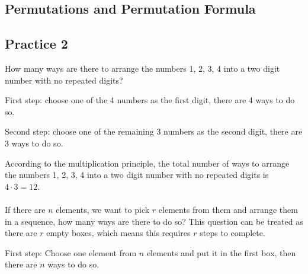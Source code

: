 \documentclass{report}
\begin{document}
\begin{multicols}{2}
  \section{Permutations and Permutation Formula}

  \subsection{Practice 2}

  How many ways are there to arrange the numbers 1, 2, 3, 4 into a two digit
  number with no repeated digits? \sol{}

  First step: choose one of the 4 numbers as the first digit, there are 4 ways to
  do so.

  Second step: choose one of the remaining 3 numbers as the second digit, there
  are 3 ways to do so.

  According to the multiplication principle, the total number of ways to arrange
  the numbers 1, 2, 3, 4 into a two digit number with no repeated digits is $4
    \cdot 3 = 12$. \\\\ If there are $n$ elements, we want to pick $r$ elements
  from them and arrange them in a sequence, how many ways are there to do so?
  This question can be treated as there are $r$ empty boxes, which means this
  requires $r$ steps to complete.

  \begin{center}
  \end{center}

  First step: Choose one element from $n$ elements and put it in the first box,
  then there are $n$ ways to do so.


\end{multicols}
\end{document}
